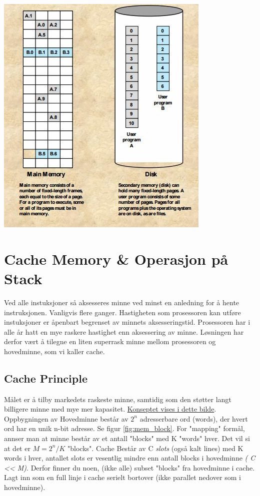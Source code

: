 \includegraphics{img/Dynamic_memory.JPG}

\section{Cache Memory \& Operasjon på Stack}
Ved alle instuksjoner så aksesseres minne ved minst en anledning for å hente instruksjonen. Vanligvis flere ganger. Hastigheten som prosessoren kan utføre instuksjoner er åpenbart begrenset av minnets aksesseringstid. Prosessoren har i alle år hatt en mye raskere hastighet enn aksessering av minne. Løsningen har derfor vært å tilegne en liten superrask minne mellom prosessoren og hovedminne, som vi kaller cache. 

\subsection{Cache Principle}
Målet er å tilby markedets raskeste minne, samtidig som den støtter langt billigere minne med mye mer kapasitet. 
\href{http://www.1024cores.net/\_/rsrc/1296469855892/home/parallel-computing/cache-oblivious-algorithms/cpu\_cache\_structure.png}{Konseptet vises i dette bilde}. 
Oppbygningen av Hovedminne består av $2^n$ adresserbare ord (words), der hvert ord har en unik n-bit adresse. Se figur \ref{fig:mem_block}. For "mapping" formål, annser man at minne består av et antall "blocks" med K "words" hver. Det vil si at det er $ M= 2^n/K$ "blocks". Cache Består av C \emph{slots} (også kalt lines) med K words i hver, antallet slots er vesentlig mindre enn antall blocks i hovedminne \emph{( C << M)}. Derfor finner du noen, (ikke alle) subset "blocks" fra hovedminne i cache. Lagt inn som en full linje i cache serielt bortover (ikke parallet nedover som i hovedminne). 

